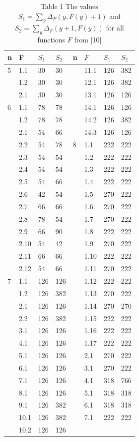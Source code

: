 \documentclass[10pt]{article}
\begin{document}
\begin{table}[h]
\begin{center}
\captionsetup{labelformat=empty}
\caption{Table 1 The values\\
$S_{1}=\sum_{y} \Delta_{F}(y, F(y)+1)$ and $S_{2}=\sum_{y} \Delta_{F}(y+1, F(y))$ for all functions $F$ from [10]}
\begin{tabular}{|l|l|l|l|l|l|l|l|}
\hline
n & F & $S_{1}$ & $S_{2}$ & n & $F$ & $S_{1}$ & $S_{2}$ \\
\hline
5 & 1.1 & 30 & 30 &  & 11.1 & 126 & 382 \\
\hline
 & 1.2 & 30 & 30 &  & 12.1 & 126 & 382 \\
\hline
 & 2.1 & 30 & 30 &  & 13.1 & 126 & 126 \\
\hline
6 & 1.1 & 78 & 78 &  & 14.1 & 126 & 126 \\
\hline
 & 1.2 & 78 & 78 &  & 14.2 & 126 & 382 \\
\hline
 & 2.1 & 54 & 66 &  & 14.3 & 126 & 126 \\
\hline
 & 2.2 & 54 & 78 & 8 & 1.1 & 222 & 222 \\
\hline
 & 2.3 & 54 & 54 &  & 1.2 & 222 & 222 \\
\hline
 & 2.4 & 54 & 54 &  & 1.3 & 222 & 222 \\
\hline
 & 2.5 & 54 & 66 &  & 1.4 & 222 & 222 \\
\hline
 & 2.6 & 42 & 54 &  & 1.5 & 270 & 222 \\
\hline
 & 2.7 & 66 & 66 &  & 1.6 & 270 & 222 \\
\hline
 & 2.8 & 78 & 54 &  & 1.7 & 270 & 222 \\
\hline
 & 2.9 & 66 & 90 &  & 1.8 & 222 & 222 \\
\hline
 & 2.10 & 54 & 42 &  & 1.9 & 270 & 222 \\
\hline
 & 2.11 & 66 & 66 &  & 1.10 & 222 & 222 \\
\hline
 & 2.12 & 54 & 66 &  & 1.11 & 270 & 222 \\
\hline
7 & 1.1 & 126 & 126 &  & 1.12 & 222 & 222 \\
\hline
 & 1.2 & 126 & 382 &  & 1.13 & 270 & 222 \\
\hline
 & 2.1 & 126 & 126 &  & 1.14 & 270 & 270 \\
\hline
 & 2.2 & 126 & 382 &  & 1.15 & 222 & 222 \\
\hline
 & 3.1 & 126 & 126 &  & 1.16 & 222 & 222 \\
\hline
 & 4.1 & 126 & 126 &  & 1.17 & 222 & 222 \\
\hline
 & 5.1 & 126 & 126 &  & 2.1 & 270 & 222 \\
\hline
 & 6.1 & 126 & 126 &  & 3.1 & 270 & 222 \\
\hline
 & 7.1 & 126 & 126 &  & 4.1 & 318 & 766 \\
\hline
 & 8.1 & 126 & 126 &  & 5.1 & 318 & 318 \\
\hline
 & 9.1 & 126 & 382 &  & 6.1 & 318 & 318 \\
\hline
 & 10.1 & 126 & 382 &  & 7.1 & 222 & 222 \\
\hline
 & 10.2 & 126 & 126 &  &  &  &  \\
\hline
\end{tabular}
\end{center}
\end{table}
\end{document}
